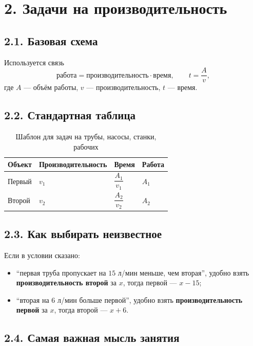\documentclass[a4paper,12pt]{article}
\begin{document}
\section*{2. Задачи на производительность}

\subsection*{2.1. Базовая схема}

Используется связь
\[
\text{работа}=\text{производительность}\cdot \text{время},
\qquad
t=\frac{A}{v},
\]
где $A$ --- объём работы, $v$ --- производительность, $t$ --- время.

\subsection*{2.2. Стандартная таблица}

\renewcommand{\arraystretch}{1.35}
\begin{table}[h!]
\centering
\caption{Шаблон для задач на трубы, насосы, станки, рабочих}
\begin{tabularx}{0.9\linewidth}{>{\raggedright\arraybackslash}p{3.1cm}XXX}
\toprule
\textbf{Объект} & \textbf{Производительность} & \textbf{Время} & \textbf{Работа} \\
\midrule
Первый & $v_1$ & $\dfrac{A_1}{v_1}$ & $A_1$ \\
Второй & $v_2$ & $\dfrac{A_2}{v_2}$ & $A_2$ \\
\bottomrule
\end{tabularx}
\end{table}

\subsection*{2.3. Как выбирать неизвестное}

Если в условии сказано:

\begin{itemize}
    \item ``первая труба пропускает на $15$ л/мин меньше, чем вторая'',  
    удобно взять \textbf{производительность второй} за $x$, тогда первой --- $x-15$;
    \item ``вторая на $6$ л/мин больше первой'',  
    удобно взять \textbf{производительность первой} за $x$, тогда второй --- $x+6$.
\end{itemize}

\subsection*{2.4. Самая важная мысль занятия}
\end{document}
